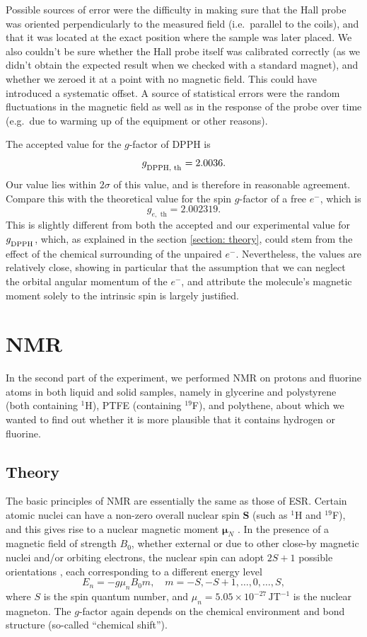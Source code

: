 \documentclass[a4paper]{jpconf}
\numberwithin{equation}{section}
\begin{document}
Possible sources of error were the difficulty in making sure that the Hall probe was oriented perpendicularly to the measured field (i.e.\ parallel to the coils), and that it was located at the exact position where the sample was later placed. We also couldn't be sure whether the Hall probe itself was calibrated correctly (as we didn't obtain the expected result when we checked with a standard magnet), and whether we zeroed it at a point with no magnetic field. This could have introduced a systematic offset. A source of statistical errors were the random fluctuations in the magnetic field as well as in the response of the probe over time (e.g.\ due to warming up of the equipment or other reasons).

The accepted value for the $g$-factor of DPPH is
\[
	g_{\textsubscript{DPPH, th}} = 2.0036.
\]
Our value lies within $2\sigma$ of this value, and is therefore in reasonable agreement.
Compare this with the theoretical value for the spin $g$-factor of a free $e^-$, which is
\[
	g_{e,\text{ th}} = 2.002319.
\]
This is slightly different from both the accepted and our experimental value for $g_{\textsubscript{DPPH}}$, which, as explained in the section \ref{section: theory}, could stem from the effect of the chemical surrounding of the unpaired $e^-$. Nevertheless, the values are relatively close, showing in particular that the assumption that we can neglect the orbital angular momentum of the $e^-$, and attribute the molecule's magnetic moment solely to the intrinsic spin is largely justified.


\section{NMR} 
In the second part of the experiment, we performed NMR on protons and fluorine atoms in both liquid and solid samples, namely in glycerine and polystyrene (both containing ${}^1$H), PTFE (containing ${}^{19}$F), and polythene, about which we wanted to find out whether it is more plausible that it contains hydrogen or fluorine.
\subsection{Theory}

The basic principles of NMR are essentially the same as those of ESR. Certain atomic nuclei can have a non-zero overall nuclear spin $\mathbf{S}$ (such as ${}^1$H and ${}^{19}$F), and this gives rise to a nuclear magnetic moment $\bm{\mu}_N$ \cite{Smith, Gero}. In the presence of a magnetic field of strength $B_0$, whether external or due to other close-by magnetic nuclei and/or orbiting electrons, the nuclear spin can adopt $2S + 1$ possible orientations \cite{Gero}, each corresponding to a different energy level
\[
	E_n = -g \mu_n B_0 m, \quad m = -S, -S+1, \dots, 0, \dots, S, 
\] 
where $S$ is the spin quantum number, and $\mu_n = 5.05 \times 10^{-27} \, \si{\joule\tesla\tothe{-1}}$ is the nuclear magneton.
The $g$-factor again depends on the chemical environment and bond structure (so-called ``chemical shift''). 
\end{document}
